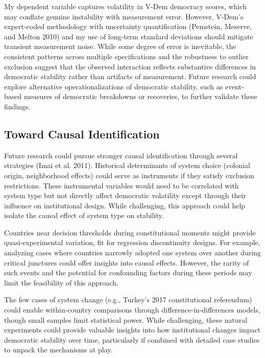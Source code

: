 \documentclass[
  letterpaper,
  DIV=11,
  numbers=noendperiod]{scrartcl}
\begin{document}
My dependent variable captures volatility in V-Dem democracy scores,
which may conflate genuine instability with measurement error. However,
V-Dem's expert-coded methodology with uncertainty quantification
(Pemstein, Meserve, and Melton 2010) and my use of long-term standard
deviations should mitigate transient measurement noise. While some
degree of error is inevitable, the consistent patterns across multiple
specifications and the robustness to outlier exclusion suggest that the
observed interaction reflects substantive differences in democratic
stability rather than artifacts of measurement. Future research could
explore alternative operationalizations of democratic stability, such as
event-based measures of democratic breakdowns or recoveries, to further
validate these findings.

\subsection{Toward Causal
Identification}\label{toward-causal-identification}

Future research could pursue stronger causal identification through
several strategies (Imai et al. 2011). Historical determinants of system
choice (colonial origin, neighborhood effects) could serve as
instruments if they satisfy exclusion restrictions. These instrumental
variables would need to be correlated with system type but not directly
affect democratic volatility except through their influence on
institutional design. While challenging, this approach could help
isolate the causal effect of system type on stability.

Countries near decision thresholds during constitutional moments might
provide quasi-experimental variation, fit for regression discontinuity
designs. For example, analyzing cases where countries narrowly adopted
one system over another during critical junctures could offer insights
into causal effects. However, the rarity of such events and the
potential for confounding factors during these periods may limit the
feasibility of this approach.

The few cases of system change (e.g., Turkey's 2017 constitutional
referendum) could enable within-country comparisons through
difference-in-differences models, though small samples limit statistical
power. While challenging, these natural experiments could provide
valuable insights into how institutional changes impact democratic
stability over time, particularly if combined with detailed case studies
to unpack the mechanisms at play.
\end{document}
